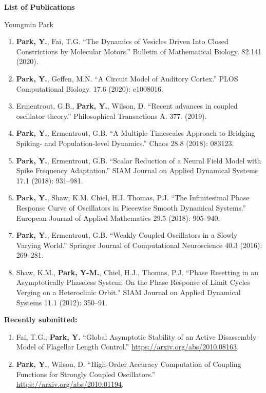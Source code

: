 \documentclass[a4paper,11pt]{article}
\begin{document}
\begin{center}
\Large \textbf{List of Publications}

\Large Youngmin Park
\end{center}

\begin{enumerate}
 \item \textbf{Park, Y.}, Fai, T.G. ``The Dynamics of Vesicles Driven Into Closed Constrictions by Molecular Motors.'' Bulletin of Mathematical Biology. 82.141 (2020).
 \item \textbf{Park, Y.}, Geffen, M.N. ``A Circuit Model of Auditory Cortex.'' PLOS Computational Biology. 17.6
 (2020): e1008016.
 \item Ermentrout, G.B., \textbf{Park, Y.}, Wilson, D. ``Recent advances in coupled oscillator theory.'' Philosophical Transactions A. 377. (2019).
 \item \textbf{Park, Y.}, Ermentrout, G.B. ``A Multiple Timescales Approach to Bridging Spiking- and Population-level Dynamics.'' Chaos 28.8 (2018): 083123.
 \item \textbf{Park, Y.}, Ermentrout, G.B. ``Scalar Reduction of a Neural Field Model with Spike Frequency Adaptation.'' SIAM Journal on Applied Dynamical Systems 17.1 (2018): 931--981.
 \item \textbf{Park, Y.}, Shaw, K.M. Chiel, H.J. Thomas, P.J. ``The Infinitesimal Phase Response Curve of Oscillators in Piecewise Smooth Dynamical Systems.'' European Journal of Applied Mathematics 29.5 (2018): 905--940.
 \item \textbf{Park, Y.}, Ermentrout, G.B. ``Weakly Coupled Oscillators in a Slowly Varying World.'' Springer Journal of Computational Neuroscience 40.3 (2016): 269--281.
 \item Shaw, K.M., \textbf{Park, Y-M.}, Chiel, H.J., Thomas, P.J. ``Phase Resetting in an Asymptotically Phaseless System: On the Phase Response of Limit Cycles Verging on a Heteroclinic Orbit." SIAM Journal on Applied Dynamical Systems 11.1 (2012): 350--91.
\end{enumerate}

\textbf{Recently submitted:}
\begin{enumerate}
	 \item Fai, T.G., \textbf{Park, Y.} ``Global Asymptotic Stability of an Active  Disassembly Model of Flagellar Length Control.''  \url{https://arxiv.org/abs/2010.08163}.
	\item \textbf{Park, Y.}, Wilson, D. ``High-Order Accuracy Computation of Coupling Functions for Strongly Coupled Oscillators.'' \url{https://arxiv.org/abs/2010.01194}.
\end{enumerate}
\end{document}
